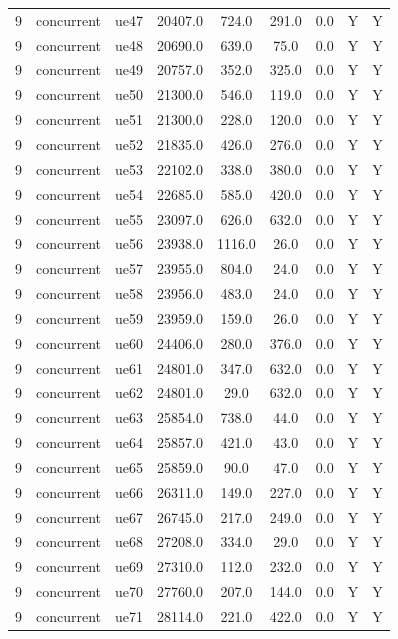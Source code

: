 \begin{table}[ht]
\begin{tabular}{|c|c|c|c|c|c|c|c|c|}
9 & concurrent & ue47 & 20407.0 & 724.0 & 291.0 & 0.0 & Y & Y \\
9 & concurrent & ue48 & 20690.0 & 639.0 & 75.0 & 0.0 & Y & Y \\
9 & concurrent & ue49 & 20757.0 & 352.0 & 325.0 & 0.0 & Y & Y \\
9 & concurrent & ue50 & 21300.0 & 546.0 & 119.0 & 0.0 & Y & Y \\
9 & concurrent & ue51 & 21300.0 & 228.0 & 120.0 & 0.0 & Y & Y \\
9 & concurrent & ue52 & 21835.0 & 426.0 & 276.0 & 0.0 & Y & Y \\
9 & concurrent & ue53 & 22102.0 & 338.0 & 380.0 & 0.0 & Y & Y \\
9 & concurrent & ue54 & 22685.0 & 585.0 & 420.0 & 0.0 & Y & Y \\
9 & concurrent & ue55 & 23097.0 & 626.0 & 632.0 & 0.0 & Y & Y \\
9 & concurrent & ue56 & 23938.0 & 1116.0 & 26.0 & 0.0 & Y & Y \\
9 & concurrent & ue57 & 23955.0 & 804.0 & 24.0 & 0.0 & Y & Y \\
9 & concurrent & ue58 & 23956.0 & 483.0 & 24.0 & 0.0 & Y & Y \\
9 & concurrent & ue59 & 23959.0 & 159.0 & 26.0 & 0.0 & Y & Y \\
9 & concurrent & ue60 & 24406.0 & 280.0 & 376.0 & 0.0 & Y & Y \\
9 & concurrent & ue61 & 24801.0 & 347.0 & 632.0 & 0.0 & Y & Y \\
9 & concurrent & ue62 & 24801.0 & 29.0 & 632.0 & 0.0 & Y & Y \\
9 & concurrent & ue63 & 25854.0 & 738.0 & 44.0 & 0.0 & Y & Y \\
9 & concurrent & ue64 & 25857.0 & 421.0 & 43.0 & 0.0 & Y & Y \\
9 & concurrent & ue65 & 25859.0 & 90.0 & 47.0 & 0.0 & Y & Y \\
9 & concurrent & ue66 & 26311.0 & 149.0 & 227.0 & 0.0 & Y & Y \\
9 & concurrent & ue67 & 26745.0 & 217.0 & 249.0 & 0.0 & Y & Y \\
9 & concurrent & ue68 & 27208.0 & 334.0 & 29.0 & 0.0 & Y & Y \\
9 & concurrent & ue69 & 27310.0 & 112.0 & 232.0 & 0.0 & Y & Y \\
9 & concurrent & ue70 & 27760.0 & 207.0 & 144.0 & 0.0 & Y & Y \\
9 & concurrent & ue71 & 28114.0 & 221.0 & 422.0 & 0.0 & Y & Y \\

\end{tabular}
\end{table}

